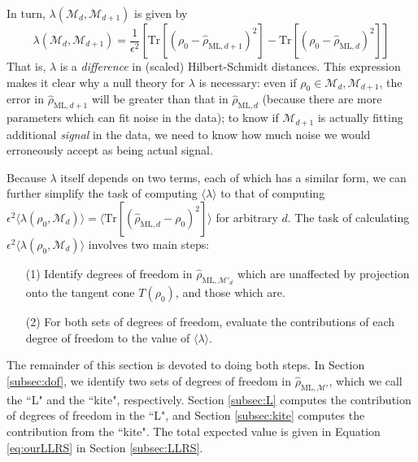 \documentclass[aps,pra, twocolumn]{revtex4-1}
\newcommand{\M}{\mathcal{M}}
\newcommand{\rhohat}{\hat{\rho}}
\newcommand{\rhoML}[1]{\rhohat_{\scriptscriptstyle{\mathrm{ML},#1}}}
\begin{document}
 In turn, $\lambda(\M_{d},\M_{d+1})$ is given by
\begin{equation}
\lambda(\M_{d}, \M_{d+1}) = \frac{1}{\epsilon^{2}}\left[\mathrm{Tr}[(\rho_{0} - \rhoML{d+1})^{2}] -  \mathrm{Tr}[(\rho_{0} - \rhoML{d})^{2}]\right]
\end{equation}
That is, $\lambda$ is a \emph{difference} in (scaled) Hilbert-Schmidt distances. This expression makes it clear why a null theory for $\lambda$ is necessary: even if $\rho_{0} \in \M_{d},\M_{d+1}$, the error in $\rhoML{d+1}$ will be greater than that in $\rhoML{d}$ (because there are more parameters which can fit noise in the data); to know if $\M_{d+1}$ is actually fitting additional \emph{signal} in the data, we need to know how much noise we would erroneously accept as being actual signal.

Because $\lambda$ itself depends on two terms, each of which has a similar form, we can further simplify the task of computing $\langle \lambda \rangle$ to that of computing $\epsilon^{2}\langle \lambda(\rho_{0}, \M_{d}) \rangle = \langle \mathrm{Tr}[(\rhoML{d}  - \rho_{0})^{2}] \rangle$ for arbitrary $d$.
The task of calculating $\epsilon^{2}\langle \lambda(\rho_{0}, \M_{d})\rangle$ involves two main steps:
\begin{itemize}
\item[(1)] Identify degrees of freedom in $\rhoML{\M'_{d}}$ which are unaffected by projection onto the tangent cone $T(\rho_{0})$, and those which are.
\item[(2)] For both sets of degrees of freedom, evaluate the contributions of each degree of freedom to the value of $\langle \lambda \rangle$.
\end{itemize}

The remainder of this section is devoted to doing both steps. In Section \ref{subsec:dof}, we identify two sets of degrees of freedom in $\rhoML{\M'}$, which we call the ``L" and the ``kite", respectively. Section \ref{subsec:L} computes the contribution of degrees of freedom in the ``L", and Section \ref{subsec:kite} computes the contribution from the ``kite". The total expected value is given in Equation \eqref{eq:ourLLRS} in Section \ref{subsec:LLRS}.
\end{document}
